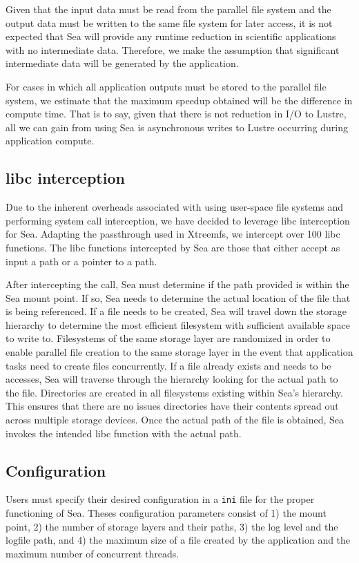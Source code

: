 \documentclass{report}
\begin{document}
    Given that the input data must be read from the parallel file system and the
    output data must be written to the same file system for later access, it is
    not expected that Sea will provide any runtime reduction in scientific applications
    with no intermediate data. Therefore, we make the assumption that significant
    intermediate data will be generated by the application.

    For cases in which all application outputs must be stored to the parallel file
    system, we estimate that the maximum speedup obtained will be the difference in
    compute time. That is to say, given that there is not reduction in I/O to Lustre,
    all we can gain from using Sea is asynchronous writes to Lustre occurring during
    application compute.

   \subsection{libc interception}\label{subs:libcintersection}

   Due to the inherent overheads associated with using user-space file systems and
   performing system call interception, we have decided to leverage libc interception
   for Sea. Adapting the passthrough used in Xtreemfs, we intercept over 100 libc functions.
   The libc functions intercepted by Sea are those that either accept as input a path
   or a pointer to a path.

   After intercepting the call, Sea must determine if the path provided is within the
   Sea mount point. If so, Sea needs to determine the actual location of the file 
   that is being referenced. If a file needs to be created, Sea will travel
   down the storage hierarchy to determine the most efficient filesystem with sufficient
   available space to write to. Filesystems of the same storage layer are randomized in
   order to enable parallel file creation to the same storage layer in the event
   that application tasks need to create files concurrently. If a file already
   exists and needs to be accesses, Sea will traverse through
   the hierarchy looking for the actual path to the file. Directories are created
   in all filesystems existing within Sea's hierarchy. This ensures that there are
   no issues directories have their contents spread out across multiple storage devices.
   Once the actual path of the file is obtained, Sea invokes the intended libc
   function with the actual path.

   \subsection{Configuration}\label{subs:configuration}
   Users must specify their desired configuration in a \texttt{ini} file for the
   proper functioning of Sea. Theses configuration parameters consist of 1) the
   mount point, 2) the number of storage layers and their paths, 3) the log level and
   the logfile path, and 4) the maximum size of a file created by the application and
   the maximum number of concurrent threads.
\end{document}
